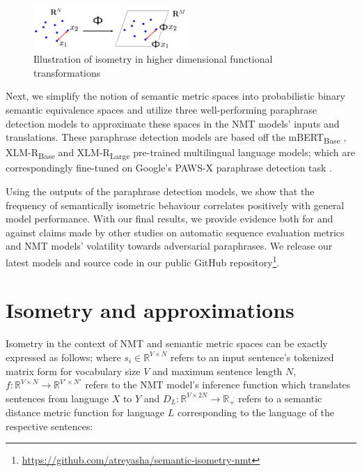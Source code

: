 \documentclass[11pt,a4paper]{article}
\begin{document}
\begin{figure}
  \centering
  \includegraphics[trim={0cm 0cm 0cm 0cm},clip,width=0.52\textwidth]{isometry_visualized.png}
  \caption{Illustration of isometry in higher dimensional functional transformations \citep{Hegde-Numax}}
  \label{isometry_visual}
\end{figure}

Next, we simplify the notion of semantic metric spaces into probabilistic binary semantic equivalence spaces and utilize three well-performing paraphrase detection models to approximate these spaces in the NMT models' inputs and translations. These paraphrase detection models are based off the mBERT\textsubscript{Base} \cite{devlin-etal-2019-bert}, XLM-R\textsubscript{Base} \cite{conneau2019unsupervised} and XLM-R\textsubscript{Large} \cite{conneau2019unsupervised} pre-trained multilingual language models; which are correspondingly fine-tuned on Google's PAWS-X paraphrase detection task \cite{pawsx2019emnlp, hu2020xtreme}.
 
Using the outputs of the paraphrase detection models, we show that the frequency of semantically isometric behaviour correlates positively with general model performance. With our final results, we provide evidence both for and against claims made by other studies on automatic sequence evaluation metrics and NMT models' volatility towards adversarial paraphrases. We release our latest models and source code in our public GitHub repository\footnote{\url{https://github.com/atreyasha/semantic-isometry-nmt}}.

\section{Isometry and approximations}

Isometry in the context of NMT and semantic metric spaces can be exactly expressed as follows; where $s_i \in \mathbb{R}^{V \times N}$ refers to an input sentence's tokenized matrix form for vocabulary size $V$ and maximum sentence length $N$, $f: \mathbb{R}^{V \times N} \to \mathbb{R}^{V' \times N'}$ refers to the NMT model's inference function which translates sentences from language $X$ to $Y$ and $D_L: \mathbb{R}^{V \times 2N} \to \mathbb{R}_+$ refers to a semantic distance metric function for language $L$ corresponding to the language of the respective sentences:
\end{document}
